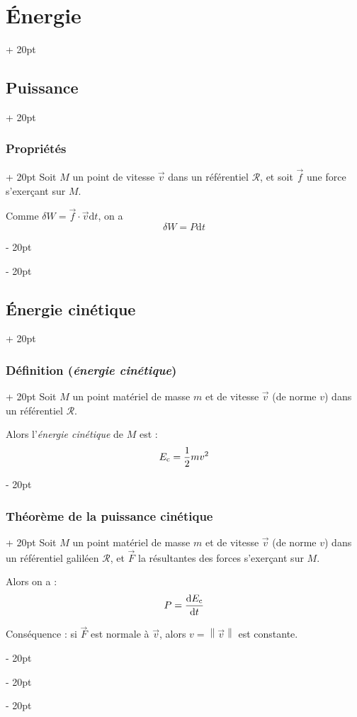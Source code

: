 \documentclass[a4paper, 12pt, twoside]{article}
\newcommand{\dt}[2][t]{\dfrac{\mathrm d #2}{\mathrm d #1}} %
\newcommand{\norm}[1]{\left\lVert #1 \right\rVert}
\newcommand{\ind}[1][20pt]{\advance\leftskip + #1}
\newcommand{\deind}[1][20pt]{\advance\leftskip - #1}
\newenvironment{indt}[2][20pt]{#2 \par \ind[#1]}{\par \deind} %
\begin{document}
\begin{indt}{\section{\'Energie}}
\begin{indt}{\subsection{Puissance}}
            \begin{indt}{\subsubsection{Propriétés}}
                Soit $M$ un point de vitesse $\vec v$ dans un référentiel $\mathscr R$, et soit $\vec f$ une force s'exerçant sur $M$.

                Comme $\delta W = \vec f \cdot \vec v \mathrm dt$, on a
                \[
                    \delta W = P\mathrm dt
                \]
            \end{indt}
        \end{indt}

        \vspace{12pt}
        
        \begin{indt}{\subsection{Énergie cinétique}}
            \begin{indt}{\subsubsection{Définition (\textit{énergie cinétique})}}
                Soit $M$ un point matériel de masse $m$ et de vitesse $\vec v$ (de norme $v$) dans un référentiel $\mathscr R$.

                Alors l'\textit{énergie cinétique} de $M$ est :
                \[
                    E_{\rm c} = \dfrac 1 2 mv^2
                \]
            \end{indt}

            \vspace{12pt}
            
            \begin{indt}{\subsubsection{Théorème de la puissance cinétique}}
                Soit $M$ un point matériel de masse $m$ et de vitesse $\vec v$ (de norme $v$) dans un référentiel galiléen $\mathscr R$, et $\vec F$ la résultantes des forces s'exerçant sur $M$.

                Alors on a :
                \[
                    P = \dt{E_{\rm c}}
                \]

                Conséquence : si $\vec F$ est normale à $\vec v$, alors $v = \norm{\vec v}$ est constante.
            \end{indt}


\end{indt}
\end{indt}
\end{document}
